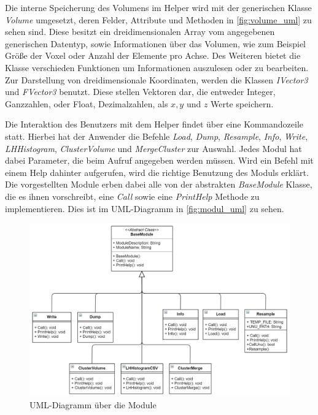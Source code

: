 Die interne Speicherung des Volumens im Helper wird mit der generischen Klasse \textit{Volume} umgesetzt, deren Felder, Attribute und Methoden in \autoref{fig:volume_uml} zu sehen sind. Diese besitzt ein dreidimensionalen Array vom angegebenen generischen Datentyp, sowie Informationen über das Volumen, wie zum Beispiel Größe der Voxel oder Anzahl der Elemente pro Achse.
\newline
Des Weiteren bietet die Klasse verschieden Funktionen um Informationen auszulesen oder zu bearbeiten. Zur Darstellung von dreidimensionale Koordinaten, werden die Klassen \textit{IVector3} und \textit{FVector3} benutzt. Diese stellen Vektoren dar, die entweder Integer, Ganzzahlen, oder Float, Dezimalzahlen, als $x,y$ und $z$ Werte speichern.


Die Interaktion des Benutzers mit dem Helper findet über eine Kommandozeile statt. Hierbei hat der Anwender die Befehle \textit{Load}, \textit{Dump}, \textit{Resample}, \textit{Info}, \textit{Write}, \textit{LHHistogram}, \textit{ClusterVolume} und \textit{MergeCluster} zur Auswahl. Jedes Modul hat dabei Parameter, die beim Aufruf angegeben werden müssen. Wird ein Befehl mit einem Help dahinter aufgerufen, wird die richtige Benutzung des Moduls erklärt.
\newline
Die vorgestellten Module erben dabei alle von der abstrakten \textit{BaseModule} Klasse, die es ihnen vorschreibt, eine \textit{Call} sowie eine \textit{PrintHelp} Methode zu implementieren. Dies ist im UML-Diagramm in \autoref{fig:modul_uml} zu sehen.


\begin{figure}
\centering 
\includegraphics[width=\textwidth]{Logos/Modules_UML.PNG}
\caption{UML-Diagramm über die Module} 
\label{fig:modul_uml} 
\end{figure}


